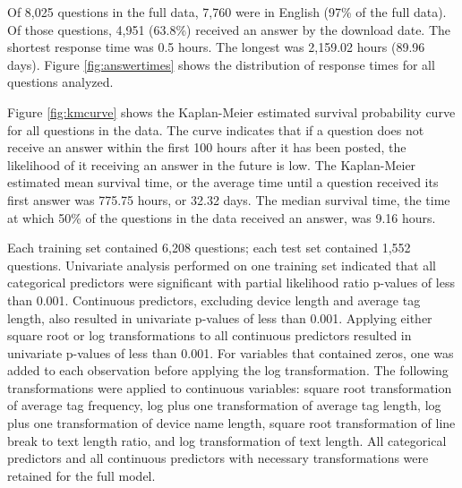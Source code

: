 \documentclass[preprint]{elsarticle}\usepackage[]{graphicx}\usepackage[]{color}
\begin{document}
  Of 8,025 questions in the full data, 7,760 were in English (97\% of the full data). Of those questions, 4,951 (63.8\%) received an answer by the download date. The shortest response time was 0.5 hours. The longest was 2,159.02 hours (89.96 days). Figure \ref{fig:answertimes} shows the distribution of response times for all questions analyzed. 




Figure \ref{fig:kmcurve} shows the Kaplan-Meier estimated survival probability curve for all questions in the data. The curve indicates that if a question does not receive an answer within the first 100 hours after it has been posted, the likelihood of it receiving an answer in the future is low. The Kaplan-Meier estimated mean survival time, or the average time until a question received its first answer was 775.75 hours, or 32.32 days. The median survival time, the time at which 50\% of the questions in the data received an answer, was 9.16 hours.




Each training set contained 6,208 questions; each test set contained 1,552 questions. Univariate analysis performed on one training set indicated that all categorical predictors were significant with partial likelihood ratio p-values of less than 0.001. Continuous predictors, excluding device length and average tag length, also resulted in univariate p-values of less than 0.001. Applying either square root or log transformations to all continuous predictors resulted in univariate p-values of less than 0.001. For variables that contained zeros, one was added to each observation before applying the log transformation. The following transformations were applied to continuous variables: square root transformation of average tag frequency, log plus one transformation of average tag length, log plus one transformation of device name length, square root transformation of line break to text length ratio, and log transformation of text length. All categorical predictors and all continuous predictors with necessary transformations were retained for the full model. 
\end{document}
